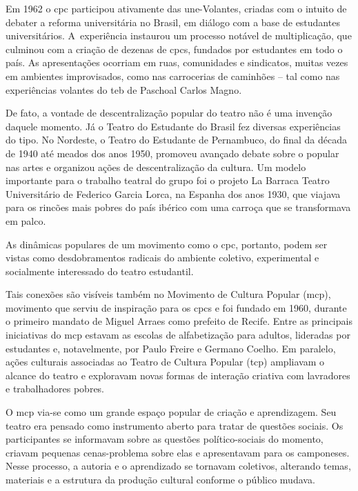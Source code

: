 Em 1962 o {\sc cpc} participou ativamente das {\sc une}-Volantes, criadas com o
intuito de debater a reforma universitária no Brasil, em diálogo com a
base de estudantes universitários. A~experiência instaurou um processo
notável de multiplicação, que culminou com a criação de dezenas de {\sc cpc}s,
fundados por estudantes em todo o país. As apresentações ocorriam em
ruas, comunidades e sindicatos, muitas vezes em ambientes improvisados,
como nas carrocerias de caminhões -- tal como nas experiências volantes
do {\sc teb} de Paschoal Carlos Magno.

De fato, a vontade de descentralização popular do teatro não é uma
invenção daquele momento. Já o Teatro do Estudante do Brasil fez
diversas experiências do tipo. No Nordeste, o Teatro do Estudante de
Pernambuco, do final da década de 1940 até meados dos anos 1950,
promoveu avançado debate sobre o popular nas artes e organizou ações de
descentralização da cultura. Um modelo importante para o trabalho
teatral do grupo foi o projeto La Barraca Teatro Universitário de
Federico Garcia Lorca, na Espanha dos anos 1930, que viajava para os
rincões mais pobres do país ibérico com uma carroça que se transformava
em palco.

As dinâmicas populares de um movimento como o {\sc cpc}, portanto, podem ser
vistas como desdobramentos radicais do ambiente coletivo, experimental e
socialmente interessado do teatro estudantil.

Tais conexões são visíveis também no Movimento de Cultura Popular
({\sc mcp}), movimento que serviu de inspiração para os {\sc cpc}s e foi fundado em
1960, durante o primeiro mandato de Miguel Arraes como prefeito de
Recife. Entre as principais iniciativas do {\sc mcp} estavam as escolas de
alfabetização para adultos, lideradas por estudantes e, notavelmente,
por Paulo Freire e Germano Coelho. Em paralelo, ações culturais
associadas ao Teatro de Cultura Popular ({\sc tcp}) ampliavam o alcance do
teatro e exploravam novas formas de interação criativa com lavradores e
trabalhadores pobres.

O {\sc mcp} via-se como um grande espaço popular de criação e aprendizagem.
Seu teatro era pensado como instrumento aberto para tratar de questões
sociais. Os participantes se informavam sobre as questões
político-sociais do momento, criavam pequenas cenas-problema sobre elas
e apresentavam para os camponeses. Nesse processo, a autoria e o
aprendizado se tornavam coletivos, alterando temas, materiais e a
estrutura da produção cultural conforme o público mudava.

